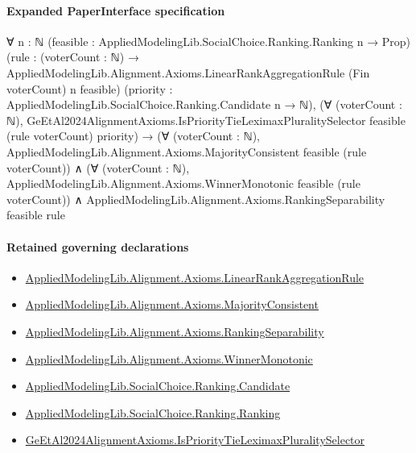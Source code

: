 \documentclass[10pt]{article}
\begin{document}
\paragraph{Expanded PaperInterface specification}
\begin{ReviewVerbatim}
∀ {n : ℕ} (feasible : AppliedModelingLib.SocialChoice.Ranking.Ranking n → Prop)
  (rule : (voterCount : ℕ) → AppliedModelingLib.Alignment.Axioms.LinearRankAggregationRule (Fin voterCount) n feasible)
  (priority : AppliedModelingLib.SocialChoice.Ranking.Candidate n → ℕ),
  (∀ (voterCount : ℕ),
      GeEtAl2024AlignmentAxioms.IsPriorityTieLeximaxPluralitySelector feasible (rule voterCount) priority) →
    (∀ (voterCount : ℕ), AppliedModelingLib.Alignment.Axioms.MajorityConsistent feasible (rule voterCount)) ∧
      (∀ (voterCount : ℕ), AppliedModelingLib.Alignment.Axioms.WinnerMonotonic feasible (rule voterCount)) ∧
        AppliedModelingLib.Alignment.Axioms.RankingSeparability feasible rule
\end{ReviewVerbatim}

\paragraph{Retained governing declarations}
\begin{itemize}\raggedright
\item \hyperlink{library-prerequisite-43447e121a1884f9}{Applied\allowbreak{}Modeling\allowbreak{}Lib.\allowbreak{}Alignment.\allowbreak{}Axioms.\allowbreak{}Linear\allowbreak{}Rank\allowbreak{}Aggregation\allowbreak{}Rule}
\item \hyperlink{library-prerequisite-5d6a6008c423d214}{Applied\allowbreak{}Modeling\allowbreak{}Lib.\allowbreak{}Alignment.\allowbreak{}Axioms.\allowbreak{}Majority\allowbreak{}Consistent}
\item \hyperlink{library-prerequisite-ad3d3904c31ec7b5}{Applied\allowbreak{}Modeling\allowbreak{}Lib.\allowbreak{}Alignment.\allowbreak{}Axioms.\allowbreak{}Ranking\allowbreak{}Separability}
\item \hyperlink{library-prerequisite-2a43c1465e4fa011}{Applied\allowbreak{}Modeling\allowbreak{}Lib.\allowbreak{}Alignment.\allowbreak{}Axioms.\allowbreak{}Winner\allowbreak{}Monotonic}
\item \hyperlink{library-prerequisite-8c0e6c25845ae78a}{Applied\allowbreak{}Modeling\allowbreak{}Lib.\allowbreak{}Social\allowbreak{}Choice.\allowbreak{}Ranking.\allowbreak{}Candidate}
\item \hyperlink{library-prerequisite-5cde54446d1ae021}{Applied\allowbreak{}Modeling\allowbreak{}Lib.\allowbreak{}Social\allowbreak{}Choice.\allowbreak{}Ranking.\allowbreak{}Ranking}
\item \hyperlink{paper-prerequisite-f75cae04980bec13}{Ge\allowbreak{}Et\allowbreak{}Al2024\allowbreak{}Alignment\allowbreak{}Axioms.\allowbreak{}Is\allowbreak{}Priority\allowbreak{}Tie\allowbreak{}Leximax\allowbreak{}Plurality\allowbreak{}Selector}
\end{itemize}
\end{document}
